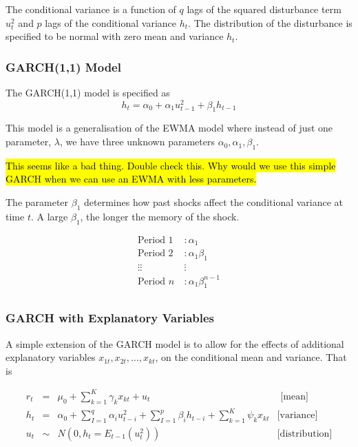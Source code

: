 \documentclass[11pt]{article}
\begin{document}
The conditional variance is a function of $q$ lags of the squared disturbance term $u_t^2$ and $p$ lags of the conditional variance $h_t$. The distribution of the disturbance is specified to be normal with zero mean and variance $h_t$.

\subsubsection{GARCH(1,1) Model}

The GARCH(1,1) model is specified as
\begin{equation}
\label{GARCH(11)}
h_t = \alpha_0 + \alpha_1 u_{t-1}^2 + \beta_1 h_{t-1}
\end{equation}

This model is a generalisation of the EWMA model where instead of just one parameter, $\lambda$, we have three unknown parameters $\alpha_0, \alpha_1, \beta_1$.

\hl{This seems like a bad thing. Double check this. Why would we use this simple GARCH when we can use an EWMA with less parameters.}


The parameter $\beta_1$ determines how past shocks affect the conditional variance at time $t$. A large $\beta_1$, the longer the memory of the shock. 

\begin{equation}
\begin{aligned}
\text{Period 1 } &: \alpha_1 \\
\text{Period 2 } &: \alpha_1\beta_1 \\
\vdots \vdots& \vdots \\
\text{Period }n &: \alpha_1\beta_1^{n-1} \\
\end{aligned}
\end{equation}

\subsubsection{GARCH with Explanatory Variables}

A simple extension of the GARCH model is to allow for the effects of additional explanatory variables $x_{1t},x_{2t},\ldots,x_{kt}$, on the conditional mean and variance. That is

\begin{equation}
\begin{array}{cccc}
r_t & = & \mu_0 + \sum_{k=1}^K \gamma_k x_{kt} + u_t & \text{ [mean]} \\
h_t & = & \alpha_0 + \sum_{I=1}^q \alpha_i u_{t-i}^2 + \sum_{I=1}^p \beta_i h_{t-i} + \sum_{k=1}^K \psi_k x_{kt} & \text{[variance]} \\
u_t & \sim & N(0,h_t = E_{t-1}(u_t^2)) & \text{[distribution]}
\end{array}
\end{equation}
\end{document}
